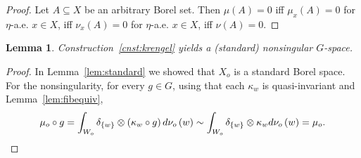 \documentclass{amsart}
\numberwithin{equation}{subsection}
\newtheorem{lem}[thm]{Lemma}
\begin{document}
\begin{proof}
Let \(A\subseteq X\) be an arbitrary Borel set. Then \(\mu\left(A\right)=0\) iff \(\mu_{x}\left(A\right)=0\) for \(\eta\)-a.e. \(x\in X\), iff \(\nu_{x}\left(A\right)=0\) for \(\eta\)-a.e. \(x\in X\), iff \(\nu\left(A\right)=0\).
\end{proof}

\begin{lem}
\label{lem:standardsigma}
Construction~\ref{cnst:krengel} yields a (standard) nonsingular \(G\)-space.
\end{lem}

\begin{proof}
In Lemma~\ref{lem:standard} we showed that \(X_{o}\) is a standard Borel space. For the nonsingularity, for every \(g\in G\), using that each \(\kappa_{w}\) is quasi-invariant and Lemma~\ref{lem:fibequiv},
\[\mu_{o}\circ g=\int_{W_{o}}\delta_{\left\{ w\right\} }\otimes\left(\kappa_{w}\circ g\right)d\nu_{o}\left(w\right)\sim\int_{W_{o}}\delta_{\left\{ w\right\} }\otimes\kappa_{w}d\nu_{o}\left(w\right)=\mu_{o}.\qedhere\]
\end{proof}
\end{document}

